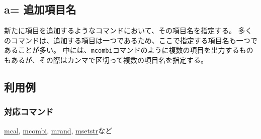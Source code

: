 
%

\subsection{a= 追加項目名\label{sect:option_a}}

新たに項目を追加するようなコマンドにおいて、その項目名を指定する。
多くのコマンドは、追加する項目は一つであるため、ここで指定する項目名も一つであることが多い。
中には、\verb|mcombi|コマンドのように複数の項目を出力するものもあるが、その際はカンマで区切って複数の項目名を指定する。

\subsection*{利用例}


\subsubsection*{対応コマンド}
\hyperref[sect:mcal]{mcal},
\hyperref[sect:mcombi]{mcombi},
\hyperref[sect:mrand]{mrand},
\hyperref[sect:msetstr]{msetstr}など

%

